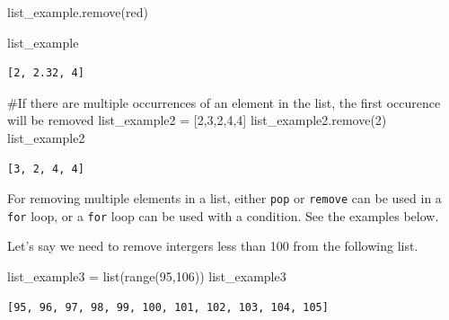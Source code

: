 \documentclass[
  letterpaper,
  DIV=11,
  numbers=noendperiod]{scrreprt}
\newenvironment{Shaded}{\begin{snugshade}}{\end{snugshade}}
\newcommand{\BuiltInTok}[1]{\textcolor[rgb]{0.00,0.23,0.31}{#1}}
\newcommand{\CommentTok}[1]{\textcolor[rgb]{0.37,0.37,0.37}{#1}}
\newcommand{\DecValTok}[1]{\textcolor[rgb]{0.68,0.00,0.00}{#1}}
\newcommand{\NormalTok}[1]{\textcolor[rgb]{0.00,0.23,0.31}{#1}}
\newcommand{\OperatorTok}[1]{\textcolor[rgb]{0.37,0.37,0.37}{#1}}
\newcommand{\StringTok}[1]{\textcolor[rgb]{0.13,0.47,0.30}{#1}}
\begin{document}
\begin{Shaded}
\begin{Highlighting}[]
\NormalTok{list\_example.remove(}\StringTok{\textquotesingle{}red\textquotesingle{}}\NormalTok{)}
\end{Highlighting}
\end{Shaded}

\begin{Shaded}
\begin{Highlighting}[]
\NormalTok{list\_example}
\end{Highlighting}
\end{Shaded}

\begin{verbatim}
[2, 2.32, 4]
\end{verbatim}

\begin{Shaded}
\begin{Highlighting}[]
\CommentTok{\#If there are multiple occurrences of an element in the list, the first occurence will be removed}
\NormalTok{list\_example2 }\OperatorTok{=}\NormalTok{ [}\DecValTok{2}\NormalTok{,}\DecValTok{3}\NormalTok{,}\DecValTok{2}\NormalTok{,}\DecValTok{4}\NormalTok{,}\DecValTok{4}\NormalTok{]}
\NormalTok{list\_example2.remove(}\DecValTok{2}\NormalTok{)}
\NormalTok{list\_example2}
\end{Highlighting}
\end{Shaded}

\begin{verbatim}
[3, 2, 4, 4]
\end{verbatim}

For removing multiple elements in a list, either \texttt{pop} or
\texttt{remove} can be used in a \texttt{for} loop, or a \texttt{for}
loop can be used with a condition. See the examples below.

Let's say we need to remove intergers less than 100 from the following
list.

\begin{Shaded}
\begin{Highlighting}[]
\NormalTok{list\_example3 }\OperatorTok{=} \BuiltInTok{list}\NormalTok{(}\BuiltInTok{range}\NormalTok{(}\DecValTok{95}\NormalTok{,}\DecValTok{106}\NormalTok{))}
\NormalTok{list\_example3}
\end{Highlighting}
\end{Shaded}

\begin{verbatim}
[95, 96, 97, 98, 99, 100, 101, 102, 103, 104, 105]
\end{verbatim}
\end{document}
